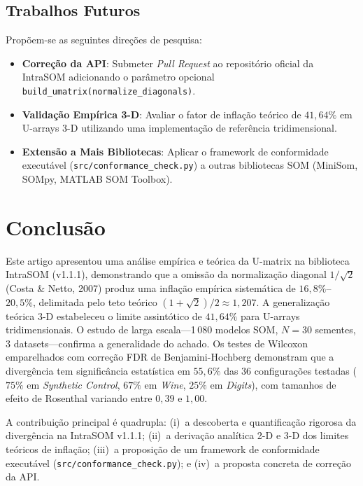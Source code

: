 \documentclass[10pt,journal,compsoc,twocolumn]{IEEEtran}
\begin{document}
\subsection{Trabalhos Futuros}
\label{subsec:futuros}
Prop\~oem-se as seguintes dire\c{c}\~oes de pesquisa:
\begin{itemize}
    \item \textbf{Corre\c{c}\~ao da API}: Submeter \textit{Pull Request} ao
    reposit\'orio oficial da IntraSOM adicionando o par\^ametro opcional
    \texttt{build\_umatrix(normalize\_diagonals)}.
    \item \textbf{Valida\c{c}\~ao Emp\'irica 3-D}: Avaliar o fator de infla\c{c}\~ao
    te\'orico de $41{,}64\%$ em U-arrays 3-D utilizando uma implementa\c{c}\~ao de refer\^encia
    tridimensional.
    \item \textbf{Extens\~ao a Mais Bibliotecas}: Aplicar o framework de
    conformidade execut\'avel (\texttt{src/conformance\_check.py}) a outras bibliotecas SOM (MiniSom, SOMpy, MATLAB SOM Toolbox).
\end{itemize}

\section{Conclus\~ao}
\label{sec:conclusao}
Este artigo apresentou uma an\'alise emp\'irica e te\'orica da U-matrix na
biblioteca IntraSOM (v1.1.1), demonstrando que a omiss\~ao da normaliza\c{c}\~ao
diagonal $1/\sqrt{2}$ (Costa \& Netto, 2007) produz uma infla\c{c}\~ao
emp\'irica sistem\'atica de $16{,}8\%$--$20{,}5\%$, delimitada pelo teto
te\'orico $(1+\sqrt{2})/2 \approx 1{,}207$. A generaliza\c{c}\~ao te\'orica 3-D
estabeleceu o limite assint\'otico de $41{,}64\%$ para U-arrays tridimensionais.
O estudo de larga escala---1\,080 modelos SOM, $N=30$ sementes, 3 datasets---confirma a generalidade do achado.
Os testes de Wilcoxon emparelhados com corre\c{c}\~ao FDR de Benjamini-Hochberg
demonstram que a diverg\^encia tem signific\^ancia estat\'istica em $55{,}6\%$
das 36 configura\c{c}\~oes testadas ($75\%$ em \textit{Synthetic Control}, $67\%$
em \textit{Wine}, $25\%$ em \textit{Digits}), com tamanhos de efeito de Rosenthal
variando entre $0{,}39$ e $1{,}00$.

A contribui\c{c}\~ao principal \'e quadrupla: (i)~a descoberta e quantifica\c{c}\~ao
rigorosa da diverg\^encia na IntraSOM v1.1.1; (ii)~a deriva\c{c}\~ao anal\'itica 2-D e 3-D dos limites te\'oricos de infla\c{c}\~ao;
(iii)~a proposi\c{c}\~ao de um framework de conformidade execut\'avel (\texttt{src/conformance\_check.py}); e (iv)~a proposta concreta de corre\c{c}\~ao da API.
\end{document}
